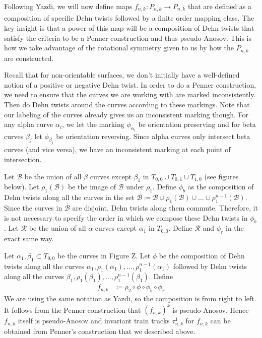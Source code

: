 Following Yazdi, we will now define maps $f_{n,k}: P_{n,k} \xrightarrow[]{} P_{n,k}$ that are defined as a composition of specific Dehn twists followed by a finite order mapping class. The key insight is that a power of this map will be a composition of Dehn twists that satisfy the criteria to be a Penner construction and thus pseudo-Anosov. This is how we take advantage of the rotational symmetry given to us by how the $P_{n,k}$ are constructed.

Recall that for non-orientable surfaces, we don't initially have a well-defined notion of a positive or negative Dehn twist. In order to do a Penner construction, we need to ensure that the curves we are working with are marked inconsistently. Then do Dehn twists around the curves according to these markings. Note that our labeling of the curves already gives us an inconsistent marking though. For any alpha curve $\alpha_i$, we let the marking $\phi_{\alpha_i}$ be orientation preserving and for beta curves $\beta_j$ let $\phi_{\beta_j}$ be orientation reversing. Since alpha curves only intersect beta curves (and vice versa), we have an inconsistent marking at each point of intersection.

Let $\mathcal{B}$ be the union of all $\beta$ curves except $\beta_1$ in $T_{0,0} \cup T_{0,1} \cup T_{1,0}$ (see figures below). Let $\rho_1(\mathcal{B})$ be the image of $\mathcal{B}$ under $\rho_1$. Define $\phi_b$ as the composition of Dehn twists along all the curves in the set $\overline{\mathcal{B}} \coloneqq \mathcal{B} \cup \rho_1(\mathcal{B}) \cup \dots \cup \rho_1^{n-1}(\mathcal{B})$. Since the curves in $\overline{\mathcal{B}}$ are disjoint, Dehn twists along them commute. Therefore, it is not necessary to specify the order in which we compose these Dehn twists in $\phi_b$. Let $\mathcal{R}$ be the union of all $\alpha$ curves except $\alpha_1$ in $T_{0,0}$. Define $\mathcal{R}$ and $\phi_r$ in the exact same way.

Let $\alpha_1,\beta_1 \subset T_{0,0}$ be the curves in Figure Z. Let $\phi$ be the composition of Dehn twists along all the curves $\alpha_1, \rho_1(\alpha_1), \dots, \rho_1^{n-1}(\alpha_1)$ followed by Dehn twists along all the curves $\beta_1,\rho_1(\beta_1),\dots,\rho_1^{n-1}(\beta_1)$. Define
\begin{align*}
    f_{n,k} &\coloneqq \rho_2 \circ \phi \circ \phi_b \circ \phi_r
\end{align*}
We are using the same notation as Yazdi, so the composition is from right to left. It follows from the Penner construction that $(f_{n,k})^k$ is pseudo-Anosov. Hence $f_{n,k}$ itself is pseudo-Anosov and invariant train tracks $\tau^1_{n,k}$ for $f_{n,k}$ can be obtained from Penner's construction that we described above.

